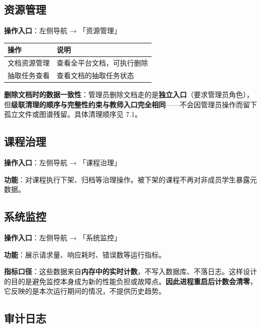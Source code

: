 \documentclass[UTF8,a4paper,11pt]{ctexrep}
\begin{document}
\subsection{资源管理}

\textbf{操作入口}：左侧导航 → 「资源管理」

\begin{center}
\small
\begin{tabularx}{\linewidth}{@{}XX@{}}
\toprule
操作 & 说明 \\
\midrule
文档资源管理 & 查看全平台文档，可执行删除 \\
抽取任务查看 & 查看文档的抽取任务状态 \\
\bottomrule
\end{tabularx}
\end{center}
\begin{notebox}
\textbf{删除文档时的数据一致性}：管理员删除文档走的是\textbf{独立入口}（要求管理员角色），但\textbf{级联清理的顺序与完整性约束与教师入口完全相同}——不会因管理员操作而留下孤立文件或图谱残留。具体清理顺序见 7.1。

\end{notebox}


\subsection{课程治理}

\textbf{操作入口}：左侧导航 → 「课程治理」

\textbf{功能}：对课程执行下架、归档等治理操作。被下架的课程不再对非成员学生暴露元数据。


\subsection{系统监控}

\textbf{操作入口}：左侧导航 → 「系统监控」

\textbf{功能}：展示请求量、响应耗时、错误数等运行指标。

\begin{notebox}
\textbf{指标口径}：这些数据来自\textbf{内存中的实时计数}，不写入数据库、不落日志。这样设计的目的是避免监控本身成为新的性能负担或故障点。\textbf{因此进程重启后计数会清零}，它反映的是本次运行期间的情况，不提供历史趋势。

\end{notebox}


\subsection{审计日志}
\end{document}
